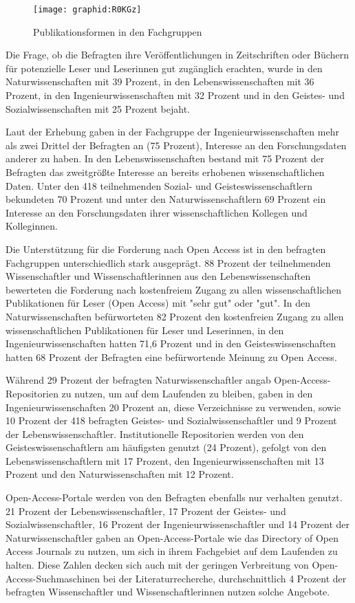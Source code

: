 \begin{figure}[h!]
\texttt{[image: graphid:R0KGz]}
\caption{Publikationsformen in den Fachgruppen}
\end{figure}

Die Frage, ob die Befragten ihre Veröffentlichungen in Zeitschriften oder Büchern für potenzielle Leser und Leserinnen gut zugänglich erachten, wurde in den Naturwissenschaften mit 39 Prozent, in den Lebenswissenschaften mit 36 Prozent, in den Ingenieurwissenschaften mit 32 Prozent und in den Geistes- und Sozialwissenschaften mit 25 Prozent bejaht.

Laut der Erhebung gaben in der Fachgruppe der Ingenieurwissenschaften mehr als zwei Drittel der Befragten an (75 Prozent), Interesse an den Forschungsdaten anderer zu haben. In den Lebenswissenschaften bestand mit 75 Prozent der Befragten das zweitgrößte Interesse an bereits erhobenen wissenschaftlichen Daten. Unter den 418 teilnehmenden Sozial- und Geisteswissenschaftlern bekundeten 70 Prozent und unter den Naturwissenschaftlern 69 Prozent ein Interesse an den Forschungsdaten ihrer wissenschaftlichen Kollegen und Kolleginnen.

Die Unterstützung für die Forderung nach Open Access ist in den befragten Fachgruppen unterschiedlich stark ausgeprägt. 88 Prozent der teilnehmenden Wissenschaftler und Wissenschaftlerinnen aus den Lebenswissenschaften bewerteten die Forderung nach kostenfreiem Zugang zu allen wissenschaftlichen Publikationen für Leser (Open Access) mit "sehr gut" oder "gut". In den Naturwissenschaften befürworteten 82 Prozent den kostenfreien Zugang zu allen wissenschaftlichen Publikationen für Leser und Leserinnen, in den Ingenieurwissenschaften hatten 71,6 Prozent und in den Geisteswissenschaften hatten 68 Prozent der Befragten eine befürwortende Meinung zu Open Access.

Während 29 Prozent der befragten Naturwissenschaftler angab Open-Access-Repositorien zu nutzen, um auf dem Laufenden zu bleiben, gaben in den Ingenieurwissenschaften 20 Prozent an, diese Verzeichnisse zu verwenden, sowie 10 Prozent der 418 befragten Geistes- und Sozialwissenschaftler und 9 Prozent der Lebenswissenschaftler. Institutionelle Repositorien werden von den Geisteswissenschaftlern am häufigsten genutzt (24 Prozent), gefolgt von den Lebenswissenschaftlern mit 17 Prozent, den Ingenieurwissenschaften  mit 13 Prozent und den Naturwissenschaften mit 12 Prozent.

Open-Access-Portale werden von den Befragten ebenfalls nur verhalten genutzt. 21 Prozent der Lebenswissenschaftler, 17 Prozent der Geistes- und Sozialwissenschaftler, 16 Prozent der Ingenieurwissenschaftler und 14 Prozent der Naturwissenschaftler gaben an Open-Access-Portale wie das Directory of Open Access Journals zu nutzen, um sich in ihrem Fachgebiet auf dem Laufenden zu halten. Diese Zahlen decken sich auch mit der geringen Verbreitung von Open-Access-Suchmaschinen bei der Literaturrecherche, durchschnittlich 4 Prozent der befragten Wissenschaftler und Wissenschaftlerinnen nutzen solche Angebote.

